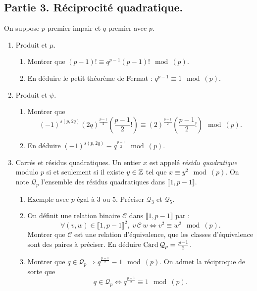 \subsection*{Partie 3. Réciprocité quadratique.}\noindent
On suppose $p$ premier impair et $q$ premier avec $p$.
\begin{enumerate} 
  \item Produit et $\mu$.
  \begin{enumerate}
    \item Montrer que $(p-1)! \equiv q^{p-1} (p-1)! \mod (p)$.
    \item En déduire le petit théorème de Fermat : $q^{p-1} \equiv 1 \mod (p)$.
  \end{enumerate}

  \item Produit et $\psi$. 
  \begin{enumerate}
    \item Montrer que 
\[
  (-1)^{s(p,2q)}(2q)^{\frac{p-1}{2}}(\frac{p-1}{2}!) \equiv (2)^{\frac{p-1}{2}}(\frac{p-1}{2}!) \mod (p).
\]
    \item En déduire $(-1)^{s(p,2q)} \equiv q^{\frac{p-1}{2}} \mod (p)$.
  \end{enumerate}

  \item Carrés et résidus quadratiques. \newline Un entier $x$ est appelé \emph{résidu quadratique} modulo $p$ si et seulement si il existe $y \in \mathbb{Z}$ tel que $x \equiv y^2 \mod (p)$. On note $\mathcal{Q}_p$ l'ensemble des résidus quadratiques dans $\llbracket 1, p-1 \rrbracket$.
  \begin{enumerate}
    \item Exemple avec $p$ égal à $3$ ou $5$. Préciser $\mathcal{Q}_3$ et $\mathcal{Q}_5$.
    \item On définit une relation binaire $\mathcal{C}$ dans $\llbracket 1, p-1 \rrbracket$ par :
\[
  \forall(v,w) \in \llbracket 1, p-1 \rrbracket^2,\; v \,\mathcal{C}\, w \Leftrightarrow v^2 \equiv w^2 \mod (p).
\]
  Montrer que $\mathcal{C}$  est une relation d'équivalence, que les classes d'équivalence sont des paires à préciser. En déduire $\operatorname{Card} \mathcal{Q}_p = \frac{p-1}{2}$.
     \item Montrer que $q \in \mathcal{Q}_p \Rightarrow q^{\frac{p-1}{2}} \equiv 1 \mod (p)$. On admet la réciproque de sorte que 
\[
  q \in \mathcal{Q}_p \Leftrightarrow q^{\frac{p-1}{2}} \equiv 1 \mod (p).
\]

  \end{enumerate}


\end{enumerate}
